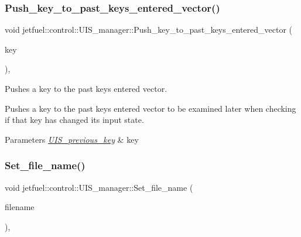 \subsubsection{\texorpdfstring{Push\+\_\+key\+\_\+to\+\_\+past\+\_\+keys\+\_\+entered\+\_\+vector()}{Push\_key\_to\_past\_keys\_entered\_vector()}}
{\footnotesize\ttfamily void jetfuel\+::control\+::\+U\+I\+S\+\_\+manager\+::\+Push\+\_\+key\+\_\+to\+\_\+past\+\_\+keys\+\_\+entered\+\_\+vector (\begin{DoxyParamCaption}\item[{\hyperlink{structjetfuel_1_1control_1_1UIS__previous__key}{U\+I\+S\+\_\+previous\+\_\+key}}]{key }\end{DoxyParamCaption})\hspace{0.3cm}{\ttfamily [inline]}, {\ttfamily [protected]}}



Pushes a key to the past keys entered vector. 

Pushes a key to the past keys entered vector to be examined later when checking if that key has changed it\textquotesingle{}s input state.


\begin{DoxyParams}{Parameters}
{\em \hyperlink{structjetfuel_1_1control_1_1UIS__previous__key}{U\+I\+S\+\_\+previous\+\_\+key}} & key \\
\hline
\end{DoxyParams}
\mbox{\label{classjetfuel_1_1control_1_1UIS__manager_aa68c473946c11071c3222d63affcfbd4}} 
\subsubsection{\texorpdfstring{Set\+\_\+file\+\_\+name()}{Set\_file\_name()}}
{\footnotesize\ttfamily void jetfuel\+::control\+::\+U\+I\+S\+\_\+manager\+::\+Set\+\_\+file\+\_\+name (\begin{DoxyParamCaption}\item[{const std\+::string}]{filename }\end{DoxyParamCaption})\hspace{0.3cm}{\ttfamily [inline]}, {\ttfamily [protected]}}




